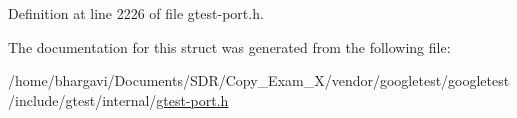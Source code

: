 Definition at line 2226 of file gtest-\/port.\+h.



The documentation for this struct was generated from the following file\+:\begin{DoxyCompactItemize}
\item 
/home/bhargavi/\+Documents/\+S\+D\+R/\+Copy\+\_\+\+Exam\+\_\+X/vendor/googletest/googletest/include/gtest/internal/\hyperlink{gtest-port_8h}{gtest-\/port.\+h}\end{DoxyCompactItemize}
